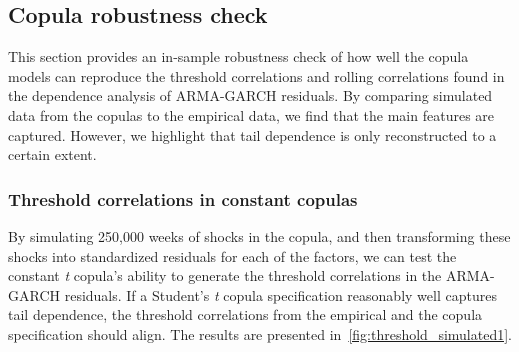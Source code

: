 \subsection{Copula robustness check}
\label{sub:05_robust}

This section provides an in-sample robustness check of how well the copula models can reproduce the threshold correlations and rolling correlations found in the dependence analysis of ARMA-GARCH residuals. By comparing simulated data from the copulas to the empirical data, we find that the main features are captured. However, we highlight that tail dependence is only reconstructed to a certain extent.

\subsubsection{Threshold correlations in constant copulas}
By simulating 250,000 weeks of shocks in the copula, and then transforming these shocks into standardized residuals for each of the factors, we can test the constant \textit{t} copula's ability to generate the threshold correlations in the ARMA-GARCH residuals. If a Student's \textit{t} copula specification reasonably well captures tail dependence, the threshold correlations from the empirical and the copula specification should align. The results are presented in~\autoref{fig:threshold_simulated1}.

